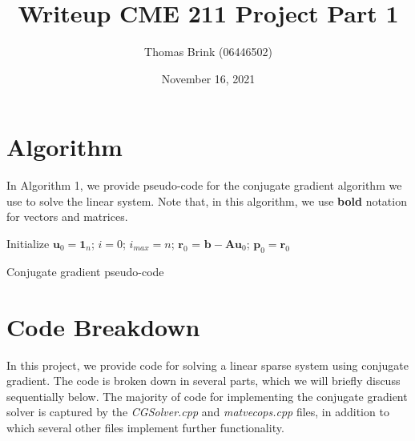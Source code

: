 \documentclass[12pt, a4paper]{article}
\title{\textbf{Writeup CME 211 Project Part 1}}
\author{Thomas Brink (06446502)}
\date{November 16, 2021}
\begin{document}
\maketitle

\section{Algorithm}
In Algorithm 1, we provide pseudo-code for
the conjugate gradient algorithm we use to solve the linear
system. Note that, in this algorithm, we use \textbf{bold}
notation for vectors and matrices.

\begin{algorithm}[h]
    \setcounter{AlgoLine}{0}
    
    
    Initialize $\mathbf{u}_0 = \mathbf{1}_n$; $i = 0$;
    $i_{max} = n$; $\mathbf{r}_0$ = $\mathbf{b} - 
    \mathbf{A}\mathbf{u}_0$; $\mathbf{p}_0 = \mathbf{r}_0$
    
    
    \caption{Conjugate gradient pseudo-code}
    \label{alg:CGSolver}
    \end{algorithm}

\newpage
\section{Code Breakdown}
In this project, we provide code for solving a linear sparse system
using conjugate gradient. The code is broken down in several parts,
which we will briefly discuss sequentially below. The majority of code
for implementing the conjugate gradient solver is captured by the
\textit{CGSolver.cpp} and \textit{matvecops.cpp} files, in addition
to which several other files implement further functionality.
\end{document}
